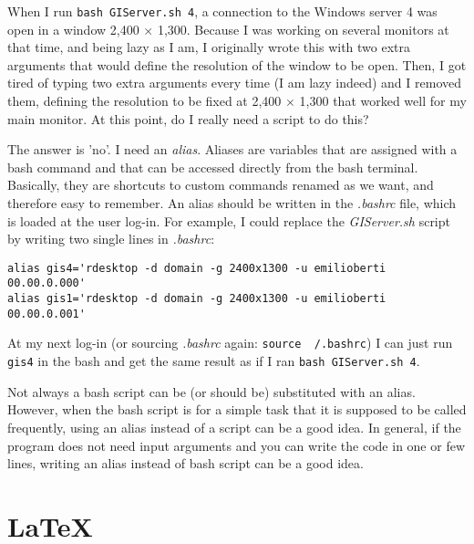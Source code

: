 \documentclass{book}
\begin{document}


When I run \texttt{bash GIServer.sh 4}, a connection to the Windows server 4 was open in a window 2,400 $\times$ 1,300. Because I was working on several monitors at that time, and being lazy as I am, I originally wrote this with two extra arguments that would define the resolution of the window to be open. Then, I got tired of typing two extra arguments every time (I am lazy indeed) and I removed them, defining the resolution to be fixed at 2,400 $\times$ 1,300 that worked well for my main monitor. At this point, do I really need a script to do this?

The answer is 'no'. I need an \textit{alias}. Aliases are variables that are assigned with a bash command and that can be accessed directly from the bash terminal. Basically, they are shortcuts to custom commands renamed as we want, and therefore easy to remember. An alias should be written in the \textit{.bashrc} file, which is loaded at the user log-in. For example, I could replace the \textit{GIServer.sh} script by writing two single lines in \textit{.bashrc}:
\begin{lstlisting}[showstringspaces=false]
alias gis4='rdesktop -d domain -g 2400x1300 -u emilioberti 00.00.0.000'
alias gis1='rdesktop -d domain -g 2400x1300 -u emilioberti 00.00.0.001'
\end{lstlisting}

At my next log-in (or sourcing \textit{.bashrc} again: \texttt{source ~/.bashrc}) I can just run \texttt{gis4} in the bash and get the same result as if I ran \texttt{bash GIServer.sh 4}.

Not always a bash script can be (or should be) substituted with an alias. However, when the bash script is for a simple task that it is supposed to be called frequently, using an alias instead of a script can be a good idea. In general, if the program does not need input arguments and you can write the code in one or few lines, writing an alias instead of bash script can be a good idea.

\chapter{\LaTeX}
\end{document}
